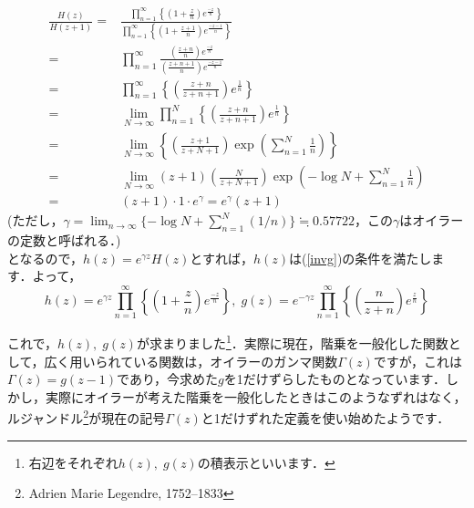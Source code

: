 \documentclass[./main]{subfile}
\begin{document}
\begin{align*}
\frac{H(z)}{H(z+1)}=&\frac{\prod_{n=1}^{\infty}\left\{\left(1+\frac{z}{n}\right)e^{\frac{-z}{n}}\right\}}{\prod_{n=1}^{\infty}\left\{\left(1+\frac{z+1}{n}\right)e^{\frac{-z-1}{n}}\right\}}\\
=&\prod_{n=1}^{\infty}\frac{\left(\frac{z+n}{n}\right)e^{\frac{-z}{n}}}{\left(\frac{z+n+1}{n}\right)e^{\frac{-z-1}{n}}}\\
=&\prod_{n=1}^{\infty}\left\{\left(\frac{z+n}{z+n+1}\right)e^{\frac{1}{n}}\right\}\\
=&\lim_{N\to\infty}\prod_{n=1}^{N}\left\{\left(\frac{z+n}{z+n+1}\right)e^{\frac{1}{n}}\right\}\\
=&\lim_{N\to\infty}\left\{\left(\frac{z+1}{z+N+1}\right)\exp\left(\sum_{n=1}^N{\frac{1}{n}}\right)\right\}\\
=&\lim_{N\to\infty}(z+1)\left(\frac{N}{z+N+1}\right)\exp\left(-\log N+\sum_{n=1}^N\frac{1}{n}\right)\\
=&(z+1)\cdot 1\cdot e^{\gamma}=e^{\gamma}(z+1)
\end{align*}
(ただし，$\gamma=\lim_{n\to\infty}\{-\log N+\sum_{n=1}^N(1/n)\}\fallingdotseq 0.57722$，この$\gamma$はオイラーの定数と呼ばれる．)\\
となるので，$h(z)=e^{\gamma z}H(z)$とすれば，$h(z)$は(\ref{invg})の条件を満たします．よって，
\[
h(z)=e^{\gamma z}\prod_{n=1}^{\infty}\left\{\left(1+\frac{z}{n}\right)e^{\frac{-z}{n}}\right\},\;g(z)=e^{-\gamma z}\prod_{n=1}^{\infty}\left\{\left(\frac{n}{z+n}\right)e^{\frac{z}{n}}\right\}
\]

これで，$h(z),\;g(z)$が求まりました\footnote{右辺をそれぞれ$h(z),\;g(z)$の積表示といいます．}．実際に現在，階乗を一般化した関数として，広く用いられている関数は，オイラーのガンマ関数$\Gamma(z)$ですが，これは$\Gamma(z)=g(z-1)$であり，今求めた$g$を1だけずらしたものとなっています．しかし，実際にオイラーが考えた階乗を一般化したときはこのようなずれはなく，ルジャンドル\footnote{Adrien Marie Legendre, 1752--1833}が現在の記号$\Gamma(z)$と1だけずれた定義を使い始めたようです．
\end{document}

